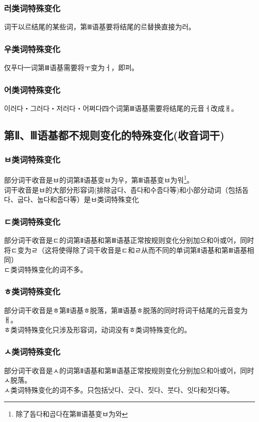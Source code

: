 \subsubsection{러类词特殊变化}%
词干以르结尾的某些词，第Ⅲ语基要将结尾的르替换直接为러。
\subsubsection{우类词特殊变化}\label{eogi:u}
仅푸다一词第Ⅲ语基需要将ㅜ变为ㅓ，即퍼。
\subsubsection{어类词特殊变化}\label{eogi:eo}
이러다・그러다・저러다・어쩌다四个词第Ⅲ语基需要将结尾的元音ㅓ改成ㅐ。
\subsection{第Ⅱ、Ⅲ语基都不规则变化的特殊变化(收音词干)}
\subsubsection{ㅂ类词特殊变化}
部分词干收音是ㅂ的词第Ⅱ语基变ㅂ为우，第Ⅲ语基变ㅂ为워\footnote{除了돕다和곱다在第Ⅲ语基变ㅂ为와}。
\\\indent 词干收音是ㅂ的大部分形容词(排除굽다、좁다和수줍다等)和小部分动词（包括돕다、굽다、눕다和줍다等）是ㅂ类词特殊变化
\subsubsection{ㄷ类词特殊变化}
部分词干收音是ㄷ的词第Ⅱ语基和第Ⅲ语基正常按规则变化分别加으和아或어，同时将ㄷ变为ㄹ（这将使得除了词干收音是ㄷ和ㄹ从而不同的单词第Ⅱ语基和第Ⅲ语基相同）
\\\indent ㄷ类词特殊变化的词不多。
\subsubsection{ㅎ类词特殊变化}
部分词干收音是ㅎ第Ⅱ语基ㅎ脱落，第Ⅲ语基ㅎ脱落的同时将词干结尾的元音变为ㅐ。
\\\indent ㅎ类词特殊变化只涉及形容词，动词没有ㅎ类词特殊变化的。
\subsubsection{ㅅ类词特殊变化}
部分词干收音是ㅅ的词第Ⅱ语基和第Ⅲ语基正常按规则变化分别加으和아或어，同时ㅅ脱落。
\\\indent ㅅ类词特殊变化的词不多。只包括낫다、긋다、짓다、붓다、잇다和젓다等。
